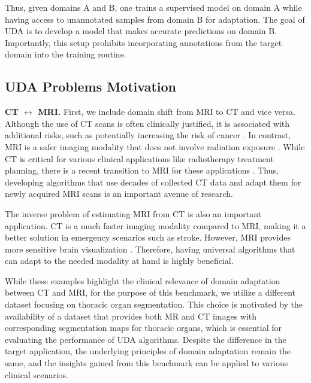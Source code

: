 Thus, given domains A and B, one trains a supervised model on domain A while having access to unannotated samples from domain B for adaptation. The goal of UDA is to develop a model that makes accurate predictions on domain B. Importantly, this setup prohibits incorporating annotations from the target domain into the training routine.



\subsection{UDA Problems Motivation}


\textbf{CT $\leftrightarrow$ MRI.} First, we include domain shift from MRI to CT and vice versa. Although the use of CT scans is often clinically justified, it is associated with additional risks, such as potentially increasing the risk of cancer \cite{cao2022ct,brenner2007computed}. In contrast, MRI is a safer imaging modality that does not involve radiation exposure \cite{nie2016estimating}. While CT is critical for various clinical applications like radiotherapy treatment planning, there is a recent transition to MRI for these applications \cite{paczona2023magnetic}. Thus, developing algorithms that use decades of collected CT data and adapt them for newly acquired MRI scans is an important avenue of research.

The inverse problem of estimating MRI from CT is also an important application. CT is a much faster imaging modality compared to MRI, making it a better solution in emergency scenarios such as stroke. However, MRI provides more sensitive brain visualization \cite{vymazal2012comparison}. Therefore, having universal algorithms that can adapt to the needed modality at hand is highly beneficial.

While these examples highlight the clinical relevance of domain adaptation between CT and MRI, for the purpose of this benchmark, we utilize a different dataset focusing on thoracic organ segmentation. This choice is motivated by the availability of a dataset that provides both MR and CT images with corresponding segmentation maps for thoracic organs, which is essential for evaluating the performance of UDA algorithms. Despite the difference in the target application, the underlying principles of domain adaptation remain the same, and the insights gained from this benchmark can be applied to various clinical scenarios.


